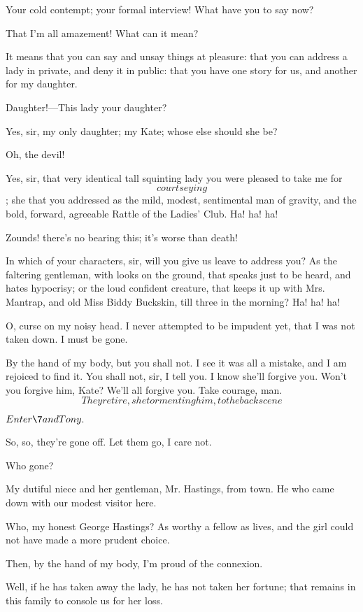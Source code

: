\documentclass{book}
\begin{document}
\3  Your cold contempt; your formal interview!  What have you
to say now?

\2  That I'm all amazement!  What can it mean?

\3  It means that you can say and unsay things at pleasure:
that you can address a lady in private, and deny it in public: that you
have one story for us, and another for my daughter.

\2  Daughter!---This lady your daughter?

\3  Yes, sir, my only daughter; my Kate; whose else should she
be?

\2  Oh, the devil!

\8  Yes, sir, that very identical tall squinting lady you
were pleased to take me for \[courtseying\]; she that you addressed as
the mild, modest, sentimental man of gravity, and the bold, forward,
agreeable Rattle of the Ladies' Club.  Ha! ha! ha!

\2  Zounds! there's no bearing this; it's worse than death!

\8  In which of your characters, sir, will you give us
leave to address you?  As the faltering gentleman, with looks on the
ground, that speaks just to be heard, and hates hypocrisy; or the loud
confident creature, that keeps it up with Mrs. Mantrap, and old Miss
Biddy Buckskin, till three in the morning?  Ha! ha! ha!

\2  O, curse on my noisy head.  I never attempted to be impudent
yet, that I was not taken down.  I must be gone.

\3  By the hand of my body, but you shall not.  I see it was
all a mistake, and I am rejoiced to find it.  You shall not, sir, I
tell you.  I know she'll forgive you.  Won't you forgive him, Kate? 
We'll all forgive you.  Take courage, man.  \[They retire, she
tormenting him, to the back scene\]


\(Enter \7 and Tony.\)


\7  So, so, they're gone off.  Let them go, I care not.

\3  Who gone?

\7  My dutiful niece and her gentleman, Mr. Hastings,
from town.  He who came down with our modest visitor here.

\1  Who, my honest George Hastings?  As worthy a fellow as
lives, and the girl could not have made a more prudent choice.

\3  Then, by the hand of my body, I'm proud of the connexion.

\7  Well, if he has taken away the lady, he has not
taken her fortune; that remains in this family to console us for her
loss.
\end{document}
